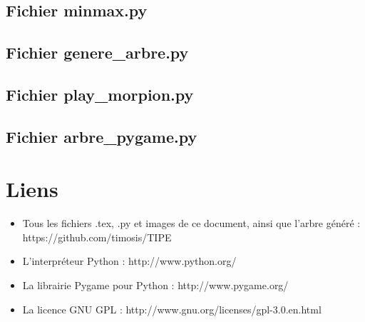 \documentclass{article}
\begin{document}
\subsection{Fichier minmax.py}

\subsection{Fichier genere\_arbre.py}

\subsection{Fichier play\_morpion.py}

\subsection{Fichier arbre\_pygame.py}




\section{Liens}

\begin{itemize}
\item Tous les fichiers .tex, .py et images de ce document, ainsi que l'arbre généré : https://github.com/timosis/TIPE

\item L'interpréteur Python : http://www.python.org/

\item La librairie Pygame pour Python : http://www.pygame.org/

\item La licence GNU GPL : http://www.gnu.org/licenses/gpl-3.0.en.html
\end{itemize}
\end{document}
